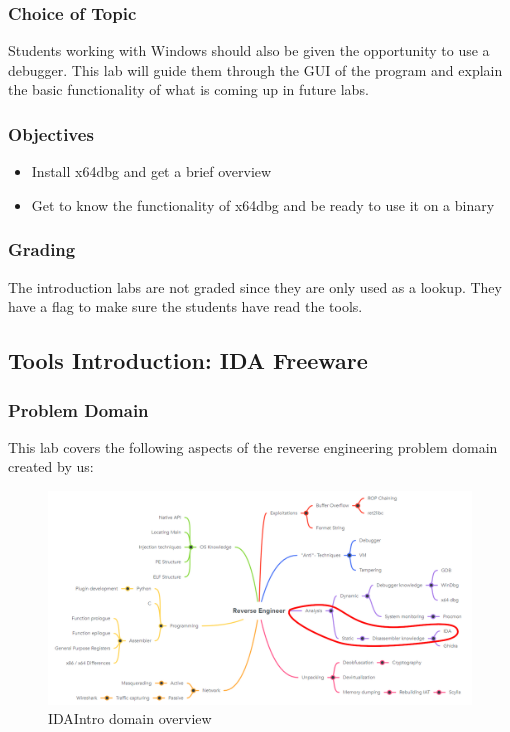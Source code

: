 \subsubsection*{Choice of Topic}
Students working with Windows should also be given the opportunity to use a debugger. This lab will guide them through the GUI of the program and explain the basic functionality of what is coming up in future labs.
\subsubsection*{Objectives}
\begin{itemize}
    \item Install x64dbg and get a brief overview
    \item Get to know the functionality of x64dbg and be ready to use it on a binary
\end{itemize}
\subsubsection*{Grading}
The introduction labs are not graded since they are only used as a lookup. They have a flag to make sure the students have read the tools.
\pagebreak

\subsection{Tools Introduction: IDA Freeware}
\subsubsection*{Problem Domain}
This lab covers the following aspects of the reverse engineering problem domain created by us:
\vspace{-2ex}
\begin{figure}[H]
    \includegraphics[width=\textwidth]{resources/IDAIntro-overview-light.png}
    \caption{IDAIntro domain overview}
    \label{fig:IDAIntro-overview}
\end{figure}
